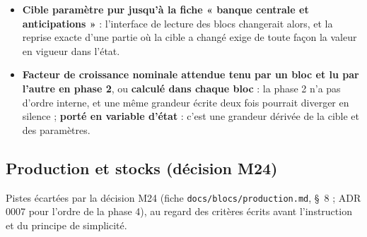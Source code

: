 \documentclass[11pt,a4paper]{article}
\begin{document}
\begin{itemize}
\item \textbf{Cible paramètre pur jusqu'à la fiche « banque centrale et anticipations »} : l'interface de lecture des blocs changerait alors, et la reprise exacte d'une partie où la cible a changé exige de toute façon la valeur en vigueur dans l'état.
\item \textbf{Facteur de croissance nominale attendue tenu par un bloc et lu par l'autre en phase 2}, ou \textbf{calculé dans chaque bloc} : la phase 2 n'a pas d'ordre interne, et une même grandeur écrite deux fois pourrait diverger en silence ; \textbf{porté en variable d'état} : c'est une grandeur dérivée de la cible et des paramètres.
\end{itemize}

\subsection*{Production et stocks (décision M24)}
Pistes écartées par la décision M24 (fiche \nolinkurl{docs/blocs/production.md}, \S~8 ; ADR 0007 pour l'ordre de la phase 4), au regard des critères écrits avant l'instruction et du principe de simplicité.
\end{document}
